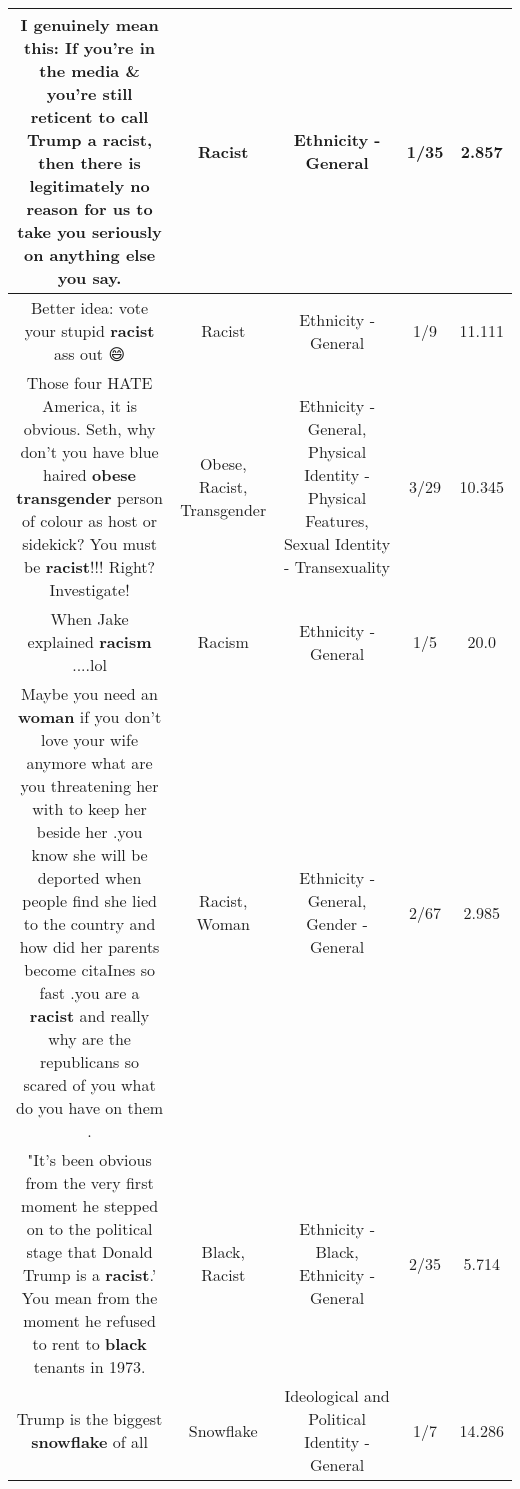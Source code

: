 \documentclass[11pt]{article}
\newlength\mylength
\begin{document}
\begin{center}
\begin{longtable}{|C{.65\mylength}|C{.30\mylength}|C{.12\mylength}|C{.12\mylength}|C{.12\mylength}|}
  \small I genuinely mean this: If you're in the media \& you're still reticent to call Trump a \textbf{racist}, then there is legitimately no reason for us to take you seriously on anything else you say.\normalsize   & Racist & Ethnicity - General & 1/35 & 2.857 \\  \hline
  \small Better idea: vote your stupid \textbf{racist} ass out 😄\normalsize   & Racist & Ethnicity - General & 1/9 & 11.111 \\  \hline
  \small Those four HATE America, it is obvious. Seth, why don't you have blue haired \textbf{obese} \textbf{transgender} person of colour as host or sidekick? You must be \textbf{racist}!!! Right? Investigate!\normalsize   & Obese, Racist, Transgender & Ethnicity - General, Physical Identity - Physical Features, Sexual Identity - Transexuality & 3/29 & 10.345 \\  \hline
  \small When Jake explained \textbf{racism} ....lol\normalsize   & Racism & Ethnicity - General & 1/5 & 20.0 \\  \hline
  \small Maybe you need an \textbf{woman} if you don't love your wife anymore what are you threatening her with to keep her beside her .you know she will be deported when people find she lied to the country and how did her parents become citaInes so fast .you are a \textbf{racist} and really why are the republicans so scared of you what do you have on them .\normalsize   & Racist, Woman & Ethnicity - General, Gender - General & 2/67 & 2.985 \\  \hline
  \small "It's been obvious from the very first moment he stepped on to the political stage that Donald Trump is a \textbf{racist}.' You mean from the moment he refused to rent to \textbf{black} tenants in 1973.\normalsize   & Black, Racist & Ethnicity - Black, Ethnicity - General & 2/35 & 5.714 \\  \hline
  \small Trump is the biggest \textbf{snowflake} of all\normalsize   & Snowflake &  Ideological and Political Identity - General & 1/7 & 14.286 \\  \hline

\end{longtable}
\end{center}
\end{document}
